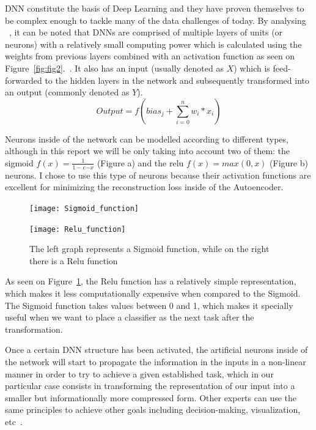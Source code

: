 DNN constitute the basis of Deep Learning and they have proven themselves to be complex enough to tackle many of the data challenges of today. By analysing ~, it can be noted that DNNs are comprised of multiple layers of units (or neurons) with a relatively small computing power which is calculated using the weights from previous layers combined with an activation function as seen on Figure~\ref{fig:fig2}.~. It also has an input (usually denoted as $X$) which is feed-forwarded to the hidden layers in the network and subsequently transformed into an output (commonly denoted as $Y$). 
%
\begin{equation}
\label{eq:artificial neuron}
Output = f( bias_j + \sum_{i = 0}^{n} w_{i}*x_i ) 
\end{equation}

Neurons inside of the network can be modelled  according to different types, although in this report we will be only taking into account two of them: the sigmoid $f(x) = \frac{1}{1 - e{-x}}$ (Figure a) and the relu $f(x) = max(0,x)$ (Figure b) neurons. I chose to use this type of neurons because their activation functions are excellent for minimizing the reconstruction loss inside of the Autoencoder. \newline
%
\begin{figure}[H]
	\begin{minipage}{.5\textwidth}
		\texttt{[image: Sigmoid\_function]}
	\end{minipage}%
	\begin{minipage}{.5\textwidth}
		\begin{flushright}
			\texttt{[image: Relu\_function]}  
		\end{flushright} 
	\end{minipage}  
	\caption{The left graph represents a Sigmoid function, while on the right there is a Relu function}
	\label{fig:fig3}
\end{figure}

As seen on Figure~\ref{fig:fig3}, the Relu function has a relatively simple representation, which makes it less computationally expensive when compared to the Sigmoid. The Sigmoid function takes values between 0 and 1, which makes it specially useful when we want to place a classifier as the next task after the transformation.\par 

Once a certain DNN structure has been activated, the artificial neurons inside of the network will start to propagate the information in the inputs in a non-linear manner in order to try to achieve a given established task, which in our particular case consists in transforming the representation of our input into a smaller but informationally more compressed form. Other experts can use the same principles to achieve other goals including decision-making, visualization, etc~\cite{Decision_making_DNN}.\par

